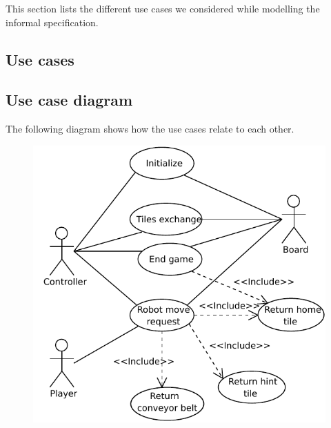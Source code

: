 This section lists the different use cases we considered while modelling the informal specification.
\subsection{Use cases}
	
\subsection{Use case diagram}
	The following diagram shows how the use cases relate to each other.

	\begin{figure}[h]
		\includegraphics[width=\linewidth]{usecases/diagram.pdf}
		\label{fig:usecases:diagram}
	\end{figure}

